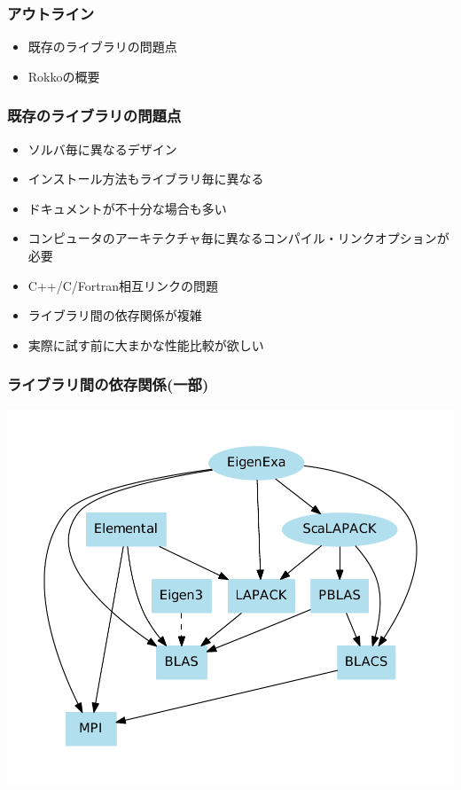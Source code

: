 \begin{frame}
  \frametitle{アウトライン}
  \begin{itemize}
  \item 既存のライブラリの問題点
  \item Rokkoの概要
  \end{itemize}
\end{frame}

\begin{frame}
  \frametitle{既存のライブラリの問題点}
  \begin{itemize}
  \item ソルバ毎に異なるデザイン
  \item インストール方法もライブラリ毎に異なる
  \item ドキュメントが不十分な場合も多い
  \item コンピュータのアーキテクチャ毎に異なるコンパイル・リンクオプションが必要
  \item C++/C/Fortran相互リンクの問題
  \item ライブラリ間の依存関係が複雑
  \item 実際に試す前に大まかな性能比較が欲しい
  \end{itemize}
\end{frame}

\begin{frame}
  \frametitle{ライブラリ間の依存関係(一部)}
  \begin{center}
    \includegraphics[height=0.8\textheight]{figure/library-dependence.pdf}
  \end{center}
\end{frame}

